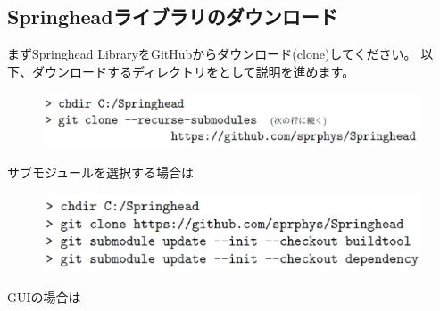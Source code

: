 \subsection{Springheadライブラリのダウンロード}
\label{subsec:Download}

\noindent
まずSpringhead LibraryをGitHubからダウンロード(clone)してください。
以下、ダウンロードするディレクトリを\SprTop{}として説明を進めます。

\medskip
\ifLwarp
	\begin{figure}[h]
	    \begin{center}
	    \includegraphics[width=\textwidth]{fig/command-2-1-a.eps}
	    \end{center}
	    \label{fig:DownloadTree}
	\end{figure}
\else
\begin{narrow}[15pt]
\end{narrow}
\fi
\medskip
サブモジュールを選択する場合は
\ifLwarp
	\begin{figure}[h]
	    \begin{center}
	    \includegraphics[width=\textwidth]{fig/command-2-1-b.eps}
	    \end{center}
	    \label{fig:DownloadTree}
	\end{figure}
\else
\begin{narrow}[15pt]
\end{narrow}
\fi
\medskip
GUIの場合は
